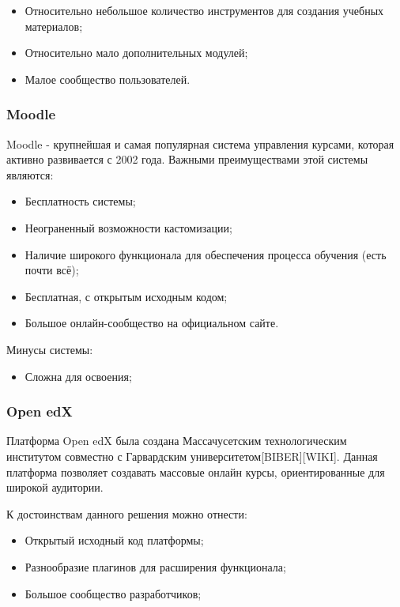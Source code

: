 \documentclass[a4paper,14pt]{article}
\begin{document}
\begin{itemize}
	\item Относительно небольшое количество инструментов для создания учебных материалов;
	\item Относительно мало дополнительных модулей;
	\item Малое сообщество пользователей.
\end{itemize} 

\subsubsection{Moodle}

Moodle - крупнейшая и самая популярная система управления курсами, которая активно развивается с 2002 года.
Важными преимуществами этой системы являются:

\begin{itemize}
	\item Бесплатность системы;
	\item Неограненный возможности кастомизации;
	\item Наличие широкого функционала для обеспечения процесса обучения (есть почти всё);
	\item Бесплатная, с открытым исходным кодом;
	\item Большое онлайн-сообщество на официальном сайте.
\end{itemize} 

Минусы системы:

\begin{itemize}
	\item Сложна для освоения;
\end{itemize} 


\subsubsection{Open edX} 

Платформа Open edX была создана Массачусетским технологическим институтом совместно с Гарвардским университетом[BIBER][WIKI].
Данная платформа позволяет создавать массовые онлайн курсы, ориентированные для широкой аудитории.

К достоинствам данного решения можно отнести:

\begin{itemize}
	\item Открытый исходный код платформы;
	\item Разнообразие плагинов для расширения функционала;
	\item Большое сообщество разработчиков;
\end{itemize}
\end{document}

